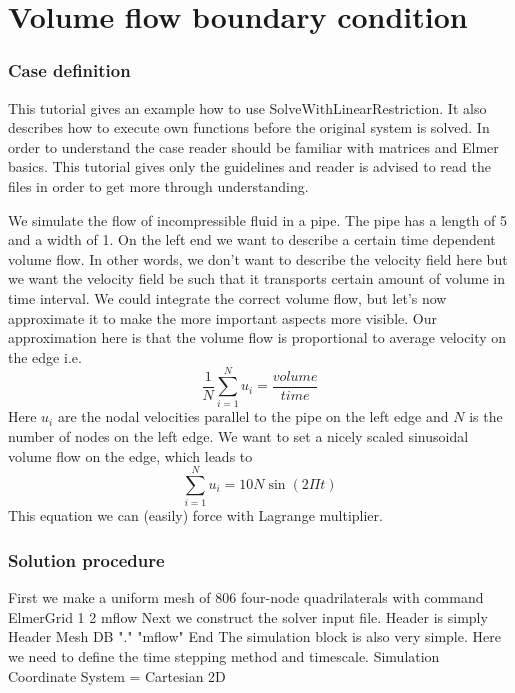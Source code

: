 \chapter{Volume flow boundary condition}


\subsection*{Case definition}

This tutorial gives an example how to use SolveWithLinearRestriction. It also describes
how to execute own functions before the original system is solved. In order to
understand the case reader should be familiar with  matrices and
Elmer basics. This tutorial gives only the guidelines and reader is advised to
read the files in order to get more through understanding.

We simulate the flow of incompressible fluid in a pipe.
The pipe has a length of 5 and a width of 1. On the left end we want to describe
a certain time dependent volume flow. In other words, we don't want to describe the velocity field
here but we want the velocity field be such that it transports certain amount of volume
in time interval. We could integrate the correct volume flow, but let's now approximate it
to make the more important aspects more visible. Our approximation here is that the volume
flow is proportional to average velocity on the edge i.e.
\begin{equation}
\frac{1}{N}\sum_{i=1}^{N}u_i = \frac{volume}{time}
\end{equation}
Here $u_i$ are the nodal velocities parallel to the pipe on the left edge and $N$ is the number of nodes on
the left edge. We want to set a nicely scaled sinusoidal volume flow on the edge, which leads to
\begin{equation}
\sum_{i=1}^{N}u_i = 10N\sin(2\Pi t)
\end{equation}
This equation we can (easily) force with Lagrange multiplier.

\subsection*{Solution procedure}
First we make a uniform mesh of 806 four-node quadrilaterals with command
\ttbegin
ElmerGrid 1 2 mflow
\ttend
Next we construct the solver input file. Header is simply
\ttbegin
Header
  Mesh DB "." "mflow"
End
\ttend
The simulation block is also very simple. 
Here we need to define the time stepping method and timescale.
\ttbegin
Simulation
  Coordinate System = Cartesian 2D

